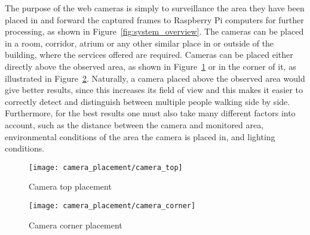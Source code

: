 The purpose of the web cameras is simply to surveillance the area they have been placed in and forward the captured frames to Raspberry Pi computers for further processing, as shown in Figure~\ref{fig:system_overview}. The cameras can be placed in a room, corridor, atrium or any other similar place in or outside of the building, where the services offered are required. Cameras can be placed either directly above the observed area, as shown in Figure~\ref{fig:camera_top} or in the corner of it, as illustrated in Figure~\ref{fig:camera_corner}. Naturally, a camera placed above the observed area would give better results, since this increases its field of view and this makes it easier to correctly detect and distinguish between multiple people walking side by side. Furthermore, for the best results one must also take many different factors into account, such as the distance between the camera and monitored area, environmental conditions of the area the camera is placed in, and lighting conditions.

\begin{figure}[ht]
	\centering
	\texttt{[image: camera\_placement/camera\_top]}
	\caption{Camera top placement}
	\label{fig:camera_top}
\end{figure}

\begin{figure}[ht]
	\centering
	\texttt{[image: camera\_placement/camera\_corner]}
	\caption{Camera corner placement}
	\label{fig:camera_corner}
\end{figure}